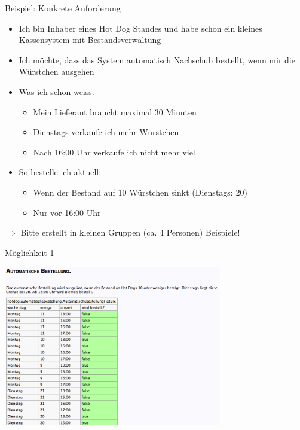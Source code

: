\begin{frame}{Beispiel: Konkrete Anforderung}

\begin{itemize}
	\item Ich bin Inhaber eines Hot Dog Standes und habe schon ein kleines Kassensystem mit Bestandsverwaltung
	\item Ich möchte, dass das System automatisch Nachschub bestellt, wenn mir die Würstchen ausgehen
	
	\item Was ich schon weiss:
	\begin{itemize}
		\item Mein Lieferant braucht maximal 30 Minuten
		\item Dienstags verkaufe ich mehr Würstchen
		\item Nach 16:00 Uhr verkaufe ich nicht mehr viel
	\end{itemize}
	
	\item So bestelle ich aktuell:
	\begin{itemize}
		\item Wenn der Bestand auf 10 Würstchen sinkt (Dienstags: 20)
		\item Nur vor 16:00 Uhr
	\end{itemize}
\end{itemize}
	
$\Rightarrow$ Bitte erstellt in kleinen Gruppen (ca. 4 Personen) Beispiele!

\end{frame}


\begin{frame}{Möglichkeit 1}

\begin{center}
\includegraphics[height=7cm]{SchlechtesBeispiel.png} \newline
\end{center}

\end{frame}

